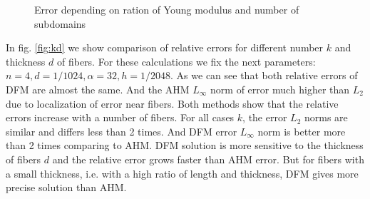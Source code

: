 \documentclass[a4paper]{jpconf}
\begin{document}
\begin{figure}[H]
    \centering
    \hfill
    \caption{Error depending on ration of Young modulus and number of subdomains}
    \label{fig:fn}
\end{figure}

In fig. \ref{fig:kd} we show comparison of relative errors for different number $k$ and thickness $d$ of fibers. For these calculations we fix the next parameters: $n = 4, d = 1/1024, \alpha = 32, h = 1/2048$.
As we can see that both relative errors of DFM are almost the same. And the AHM $L_\infty$ norm of error much higher than $L_2$ due to localization of error near fibers. Both methods show that the relative errors increase with a number of fibers. For all cases $k$, the error $L_2$ norms are similar and differs less than 2 times. And DFM error $L_\infty$ norm is better more than 2 times comparing to AHM.
DFM solution is more sensitive to the thickness of fibers $d$ and the relative error grows faster than AHM error. But for fibers with a small thickness, i.e. with a high ratio of length and thickness, DFM gives more precise solution than AHM.
\end{document}

